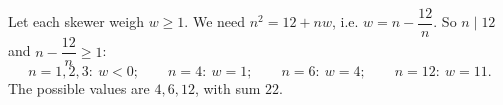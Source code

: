 Let each skewer weigh $w\ge1$. We need $n^2=12+nw$, i.e. $w=n-\dfrac{12}{n}$. So $n\mid12$ and $n-\dfrac{12}n\ge1$:
\[n=1,2,3:\ w<0;\qquad n=4:\ w=1;\qquad n=6:\ w=4;\qquad n=12:\ w=11.\]
The possible values are $4,6,12$, with sum $\boxed{22}$.

